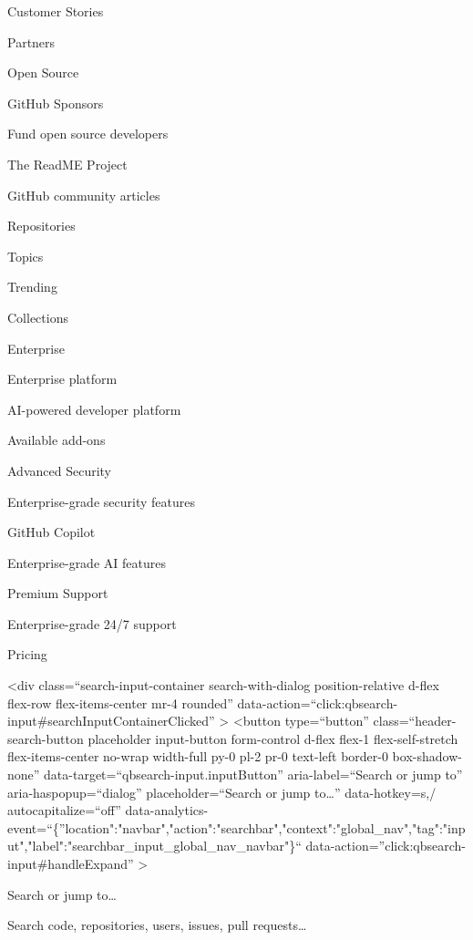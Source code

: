 \documentclass[
  letterpaper,
]{book}
\begin{document}
Customer Stories

Partners

Open Source

GitHub Sponsors

Fund open source developers

The ReadME Project

GitHub community articles

\label{open-source-repositories-heading}{Repositories}

Topics

Trending

Collections

Enterprise

Enterprise platform

AI-powered developer platform

\label{enterprise-available-add-ons-heading}{Available
add-ons}

Advanced Security

Enterprise-grade security features

GitHub Copilot

Enterprise-grade AI features

Premium Support

Enterprise-grade 24/7 support

Pricing

\textless div class=``search-input-container search-with-dialog
position-relative d-flex flex-row flex-items-center mr-4 rounded''
data-action=``click:qbsearch-input\#searchInputContainerClicked''
\textgreater{} \textless button type=``button''
class=``header-search-button placeholder input-button form-control
d-flex flex-1 flex-self-stretch flex-items-center no-wrap width-full
py-0 pl-2 pr-0 text-left border-0 box-shadow-none''
data-target=``qbsearch-input.inputButton'' aria-label=``Search or jump
to'' aria-haspopup=``dialog'' placeholder=``Search or jump
to\ldots{}'' data-hotkey=s,/ autocapitalize=``off''
data-analytics-event=``\{''location":"navbar","action":"searchbar","context":"global\_nav","tag":"input","label":"searchbar\_input\_global\_nav\_navbar"\}``
data-action=''click:qbsearch-input\#handleExpand'' \textgreater{}

{Search or jump to\ldots{}}

Search code, repositories, users, issues, pull requests\ldots{}
\end{document}
